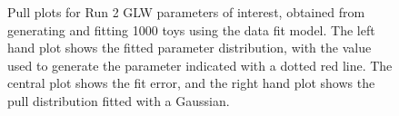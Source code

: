 \begin{figure}
\begin{tabular}{c}
  \end{tabular}
  \caption{Pull plots for Run 2 GLW parameters of interest, obtained from generating and fitting 1000 toys using the data fit model. The left hand plot shows the fitted parameter distribution, with the value used to generate the parameter indicated with a dotted red line. The central plot shows the fit error, and the right hand plot shows the pull distribution fitted with a Gaussian.}
\label{fig:GLW_run2_pulls}
\end{figure}
